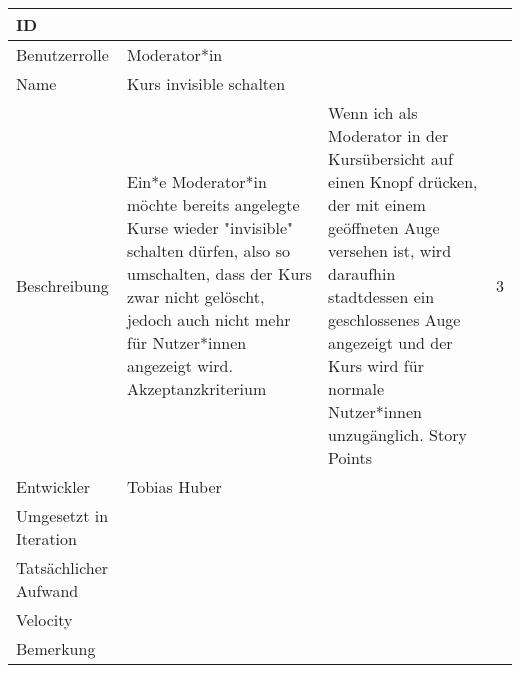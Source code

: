 \begin{tabularx}{\textwidth}{|p{}|X|}
	\hline
	ID & \\
	\hline
	Benutzerrolle & Moderator*in\\
	\hline
	Name & Kurs invisible schalten\\
	\hline
	Beschreibung & Ein*e Moderator*in möchte bereits angelegte Kurse wieder "invisible" schalten dürfen, also so umschalten, dass der Kurs zwar nicht gelöscht, jedoch auch nicht mehr für Nutzer*innen angezeigt wird.
	\hline
	Akzeptanzkriterium & Wenn ich als Moderator in der Kursübersicht auf einen Knopf drücken, der mit einem geöffneten Auge versehen ist, wird daraufhin stadtdessen ein geschlossenes Auge angezeigt und der Kurs wird für normale Nutzer*innen unzugänglich.
	\hline
	Story Points & 3\\
	\hline
	Entwickler & Tobias Huber\\
	\hline
	Umgesetzt in Iteration & \\
	\hline
	Tatsächlicher Aufwand & \\
	\hline
	Velocity & \\
	\hline
	Bemerkung & \\
	\hline
\end{tabularx}
\vspace{20pt}
